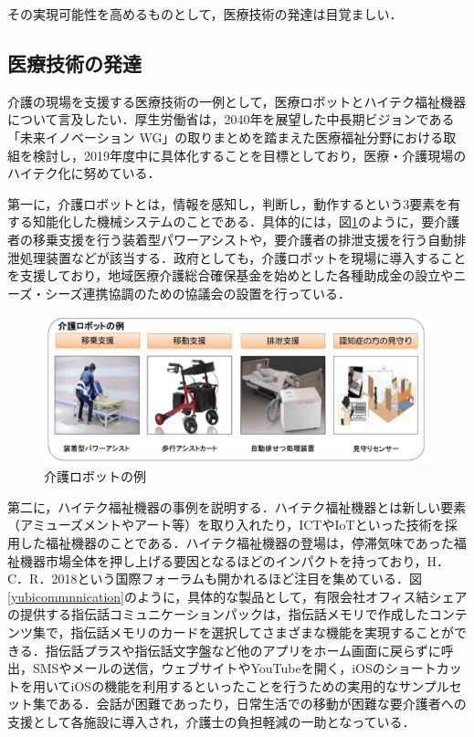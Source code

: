 その実現可能性を高めるものとして，医療技術の発達は目覚ましい．

\subsection{医療技術の発達}

介護の現場を支援する医療技術の一例として，医療ロボットとハイテク福祉機器について言及したい．厚生労働省は，2040年を展望した中長期ビジョンである「未来イノベーション WG」の取りまとめを踏まえた医療福祉分野における取組を検討し，2019年度中に具体化することを目標としており，医療・介護現場のハイテク化に努めている\cite{care_robots}．

第一に，介護ロボットとは，情報を感知し，判断し，動作するという3要素を有する知能化した機械システムのことである．具体的には，図\ref{care_robots}のように，要介護者の移乗支援を行う装着型パワーアシストや，要介護者の排泄支援を行う自動排泄処理装置などが該当する．政府としても，介護ロボットを現場に導入することを支援しており，地域医療介護総合確保基金を始めとした各種助成金の設立やニーズ・シーズ連携協調のための協議会の設置を行っている．

\begin{figure}[htb]
 \begin{center}
 \includegraphics[scale=0.4]{figures/care_robots}
 \caption[介護ロボットの例]{介護ロボットの例 \label{care_robots}}
 \end{center}
\end{figure}

第二に，ハイテク福祉機器の事例を説明する．ハイテク福祉機器とは新しい要素（アミューズメントやアート等）を取り入れたり，ICTやIoTといった技術を採用した福祉機器のことである．ハイテク福祉機器の登場は，停滞気味であった福祉機器市場全体を押し上げる要因となるほどのインパクトを持っており，H．C．R．2018という国際フォーラムも開かれるほど注目を集めている．図\ref{yubicommnnication}のように，具体的な製品として，有限会社オフィス結シェアの提供する指伝話コミュニケーションパックは，指伝話メモリで作成したコンテンツ集で，指伝話メモリのカードを選択してさまざまな機能を実現することができる．指伝話プラスや指伝話文字盤など他のアプリをホーム画面に戻らずに呼出，SMSやメールの送信，ウェブサイトやYouTubeを開く，iOSのショートカットを用いてiOSの機能を利用するといったことを行うための実用的なサンプルセット集である．会話が困難であったり，日常生活での移動が困難な要介護者への支援として各施設に導入され，介護士の負担軽減の一助となっている．

